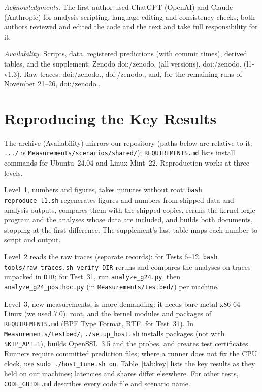 \documentclass[sigconf,9pt,nonacm]{acmart}
\begin{document}
\emph{Acknowledgments.} The first author used ChatGPT (OpenAI) and Claude (Anthropic) for analysis scripting, language editing and consistency checks; both authors reviewed and edited the code and the text and take full responsibility for it.
\par\emph{Availability.} Scripts, data, registered predictions (with commit times), derived tables, and the supplement: Zenodo doi:/\allowbreak zenodo. (all versions), doi:/\allowbreak zenodo. (l1-v1.3). Raw traces: doi:/\allowbreak zenodo., doi:/\allowbreak zenodo., and, for the remaining runs of November 21--26, doi:/\allowbreak zenodo..

\appendix
\section{Reproducing the Key Results}\label{app:repl}
The archive (Availability) mirrors our repository (paths below are relative to it; \texttt{.../} is \texttt{Measurements/\allowbreak scenarios/\allowbreak shared/}); \texttt{REQUIREMENTS.md} lists install commands for Ubuntu~24.04 and Linux Mint~22. Reproduction works at three levels. 

Level~1, numbers and figures, takes minutes without root: \texttt{bash reproduce\_\allowbreak l1.sh} regenerates figures and numbers from shipped data and analysis outputs, compares them with the shipped copies, reruns the kernel-logic program and the analyses whose data are included, and builds both documents, stopping at the first difference. The supplement's last table maps each number to script and output.

Level~2 reads the raw traces (separate records): for Tests 6--12, \texttt{bash tools/raw\_traces.sh verify DIR} reruns and compares the analyses on traces unpacked in \texttt{DIR}; for Test~31, run \texttt{analyze\_g24.py}, then \texttt{analyze\_g24\_posthoc.py} (in \texttt{Measurements/testbed/}) per machine.

Level~3, new measurements, is more demanding: it needs bare-metal x86-64 Linux (we used 7.0), root, and the kernel modules and packages of \texttt{REQUIREMENTS.md} (BPF Type Format, BTF, for Test~31). In \texttt{Measurements/testbed/}, \texttt{./setup\_host.sh} installs packages (not with \texttt{SKIP\_APT=1}), builds OpenSSL~3.5 and the probes, and creates test certificates. Runners require committed prediction files; where a runner does not fix the CPU clock, use \texttt{sudo ./host\_tune.sh on}. Table~\ref{tab:key} lists the key results as they held on our machines; latencies and shares differ elsewhere. For other tests, \texttt{CODE\_\allowbreak GUIDE.md} describes every code file and scenario name.
\end{document}
